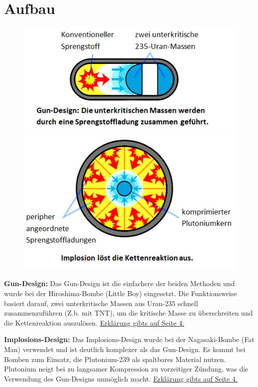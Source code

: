\documentclass[a4paper,12pt]{article}
\begin{document}
\section{Aufbau}
\begin{figure}
    \vspace{-1cm}
    \includegraphics[scale=0.7]{Gun.png}
    \includegraphics[scale=0.7]{Implosion.png}
\end{figure}

\textbf{Gun-Design:}
Das Gun-Design ist die einfachere der beiden Methoden und wurde bei der Hiroshima-Bombe (Little Boy) eingesetzt. Die Funktionsweise basiert darauf, 
zwei unterkritische Massen aus Uran-235 schnell zusammenzuführen (Z.b. mit TNT), um die kritische Masse zu überschreiten und die Kettenreaktion auszulösen. \hyperlink{gun_section}{Erklärung gibts auf Seite 4.}

\vspace*{2cm}

\noindent\textbf{Implosions-Design:}
Das Implosions-Design wurde bei der Nagasaki-Bombe (Fat Man) verwendet und ist deutlich komplexer als das Gun-Design. Es kommt bei Bomben zum Einsatz, die Plutonium-239 als spaltbares Material nutzen. 
Plutonium neigt bei zu langsamer Kompression zu vorzeitiger Zündung, was die Verwendung des Gun-Designs unmöglich macht. \hyperlink{implosion_section}{Erklärung gibts auf Seite 4.}
\end{document}
